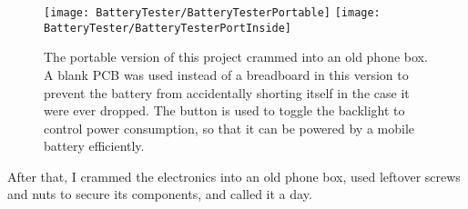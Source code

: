 \begin{figure}[h]
    \centering
    \texttt{[image: BatteryTester/BatteryTesterPortable]}
    \texttt{[image: BatteryTester/BatteryTesterPortInside]}
    \caption{
    The portable version of this project crammed into an old phone box. A blank PCB was used instead of a breadboard in this version to prevent the battery from accidentally shorting itself in the case it were ever dropped. The button is used to toggle the backlight to control power consumption, so that it can be powered by a mobile battery efficiently.
    }
\end{figure}

After that, I crammed the electronics into an old phone box, used leftover screws and nuts to secure its components, and called it a day.
